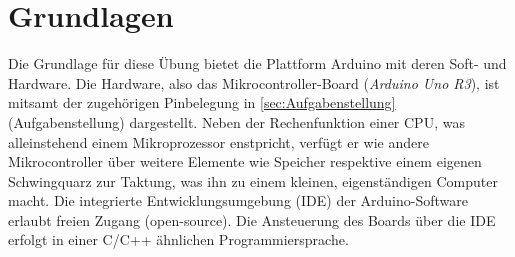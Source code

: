 \documentclass[12pt,english,ngerman]{scrartcl}
\begin{document}

\tableofcontents
\newpage




 

 
 
 


\section{Grundlagen}\label{sec:Grundlagen}
Die Grundlage für diese Übung bietet die Plattform Arduino mit deren
Soft- und Hardware. Die Hardware, also das Mikrocontroller-Board (\textit{Arduino Uno R3}),
ist mitsamt der zugehörigen Pinbelegung in \autoref{sec:Aufgabenstellung}
(Aufgabenstellung) dargestellt. Neben der Rechenfunktion einer CPU,
was alleinstehend einem Mikroprozessor enstpricht, verfügt er wie andere
Mikrocontroller über weitere Elemente
wie Speicher respektive einem eigenen Schwingquarz zur Taktung,
was ihn zu einem kleinen, eigenständigen Computer macht.
Die integrierte Entwicklungsumgebung (IDE) der Arduino-Software erlaubt
freien Zugang (open-source). Die Ansteuerung des Boards über die IDE
erfolgt in einer C/C++ ähnlichen Programmiersprache.
\end{document}
